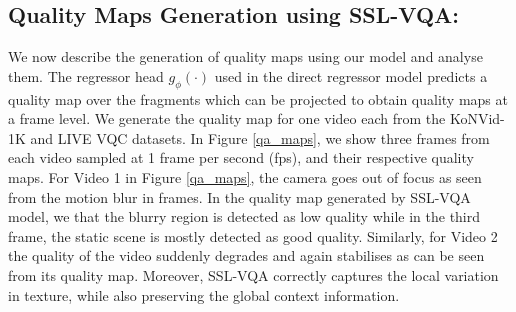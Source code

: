 \documentclass[10pt,twocolumn,letterpaper]{article}
\begin{document}
\subsection*{Quality Maps Generation using SSL-VQA:}
We now describe the generation of quality maps using our model and analyse them. 
The regressor head $g_\phi(\cdot)$ used in the direct regressor model predicts a quality map over the fragments which can be projected to obtain quality maps at a frame level. We generate the quality map for one video each from the KoNVid-1K and LIVE VQC datasets. In Figure \ref{qa_maps}, we show three frames from each video sampled at 1 frame per second (fps), and their respective quality maps. For Video 1 in Figure \ref{qa_maps}, the camera goes out of focus as seen from the motion blur in frames. In the quality map generated by SSL-VQA model, we that the blurry region is detected as low quality while in the third frame, the static scene is mostly detected as good quality. Similarly, for Video 2 the quality of the video suddenly degrades and again stabilises as can be seen from its quality map. Moreover, SSL-VQA correctly captures the local variation in texture, while also preserving the global context information.
\end{document}
